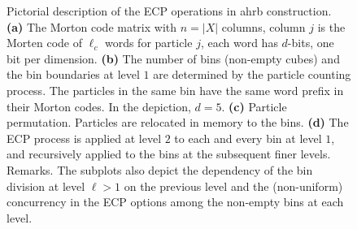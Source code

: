 \documentclass[final]{juliacon}
\begin{document}
%
%
%
%
%
%
\begin{figure}[!hb]
  \centering
  \vspace*{0.5em}
  \caption{Pictorial description of the ECP operations in {\sc ahrb}
    construction.
    {\bf (a)} The Morton code matrix with $n=|X|$ columns, column $j$
    is the Morten code of $\ell_c$ words for particle $j$, each word
    has $d$-bits, one bit per dimension.  
    {\bf (b)} The number of bins (non-empty cubes)
    and the bin boundaries at level $1$ are determined by the particle
    counting process. The particles in the same bin have the same word
    prefix in their Morton codes. In the depiction, $d=5$. 
    {\bf (c)} Particle permutation. Particles are relocated in memory to
    the bins.
    {\bf (d)} The ECP process is applied at level $2$ to each and
    every bin at level $1$, and recursively applied to the bins at the
    subsequent finer levels. 
    {\sc Remarks.} The subplots also depict the dependency of
    the bin division at level $\ell>1$ on the previous level and the
    (non-uniform) concurrency in the ECP options among the non-empty
    bins at each level.}
    \label{fig:ecp-depiction}
  \end{figure} %
\end{document}
